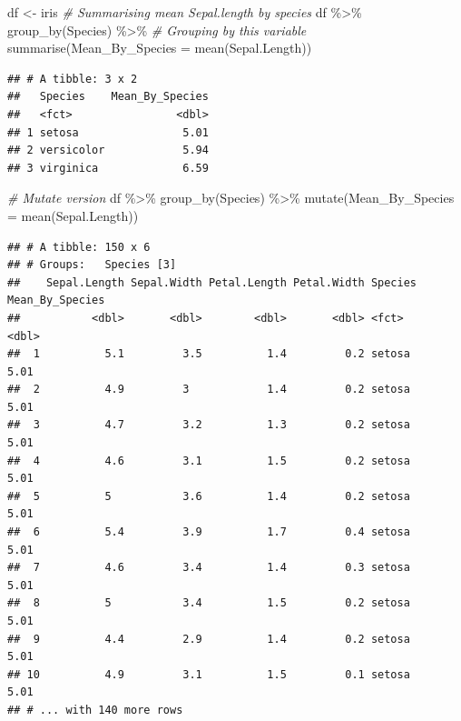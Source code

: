 \documentclass[
]{book}
\newenvironment{Shaded}{\begin{snugshade}}{\end{snugshade}}
\newcommand{\AttributeTok}[1]{\textcolor[rgb]{0.77,0.63,0.00}{#1}}
\newcommand{\CommentTok}[1]{\textcolor[rgb]{0.56,0.35,0.01}{\textit{#1}}}
\newcommand{\FunctionTok}[1]{\textcolor[rgb]{0.00,0.00,0.00}{#1}}
\newcommand{\NormalTok}[1]{#1}
\newcommand{\OtherTok}[1]{\textcolor[rgb]{0.56,0.35,0.01}{#1}}
\newcommand{\SpecialCharTok}[1]{\textcolor[rgb]{0.00,0.00,0.00}{#1}}
\begin{document}
\begin{Shaded}
\begin{Highlighting}[]
\NormalTok{df }\OtherTok{\textless{}{-}}\NormalTok{ iris}
\CommentTok{\# Summarising mean Sepal.length by species}
\NormalTok{df }\SpecialCharTok{\%\textgreater{}\%} 
  \FunctionTok{group\_by}\NormalTok{(Species) }\SpecialCharTok{\%\textgreater{}\%}  \CommentTok{\# Grouping by this variable}
  \FunctionTok{summarise}\NormalTok{(}\AttributeTok{Mean\_By\_Species =} \FunctionTok{mean}\NormalTok{(Sepal.Length)) }
\end{Highlighting}
\end{Shaded}

\begin{verbatim}
## # A tibble: 3 x 2
##   Species    Mean_By_Species
##   <fct>                <dbl>
## 1 setosa                5.01
## 2 versicolor            5.94
## 3 virginica             6.59
\end{verbatim}

\begin{Shaded}
\begin{Highlighting}[]
\CommentTok{\# Mutate version}
\NormalTok{df }\SpecialCharTok{\%\textgreater{}\%} 
  \FunctionTok{group\_by}\NormalTok{(Species) }\SpecialCharTok{\%\textgreater{}\%} 
  \FunctionTok{mutate}\NormalTok{(}\AttributeTok{Mean\_By\_Species =} \FunctionTok{mean}\NormalTok{(Sepal.Length))}
\end{Highlighting}
\end{Shaded}

\begin{verbatim}
## # A tibble: 150 x 6
## # Groups:   Species [3]
##    Sepal.Length Sepal.Width Petal.Length Petal.Width Species Mean_By_Species
##           <dbl>       <dbl>        <dbl>       <dbl> <fct>             <dbl>
##  1          5.1         3.5          1.4         0.2 setosa             5.01
##  2          4.9         3            1.4         0.2 setosa             5.01
##  3          4.7         3.2          1.3         0.2 setosa             5.01
##  4          4.6         3.1          1.5         0.2 setosa             5.01
##  5          5           3.6          1.4         0.2 setosa             5.01
##  6          5.4         3.9          1.7         0.4 setosa             5.01
##  7          4.6         3.4          1.4         0.3 setosa             5.01
##  8          5           3.4          1.5         0.2 setosa             5.01
##  9          4.4         2.9          1.4         0.2 setosa             5.01
## 10          4.9         3.1          1.5         0.1 setosa             5.01
## # ... with 140 more rows
\end{verbatim}
\end{document}
